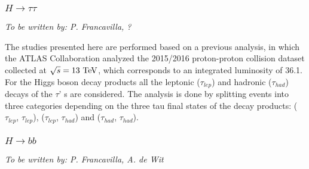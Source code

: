 


\subsubsection{$H \to \tau\tau$}
{\it To be written by: P. Francavilla, ?}

The studies presented here are performed based on a previous analysis, in which the ATLAS Collaboration analyzed the 2015/2016 proton-proton collision dataset collected at $\sqrt{s} = 13\,\TeV$, which corresponds to an integrated luminosity of 36.1\fbinv \cite{}. 
For the Higgs boson decay products all the leptonic ($\tau_{lep}$) and hadronic ($\tau_{had}$) decays of the $\tau$' s are considered. The analysis is done by splitting events into three categories depending on the three tau final states of the decay products: ($\tau_{lep}$, $\tau_{lep}$), ($\tau_{lep}$, $\tau_{had}$) and ($\tau_{had}$, $\tau_{had}$).



\subsubsection{$H \to bb$}
{\it To be written by: P. Francavilla, A. de Wit}

\newcommand{\TeV}{\ensuremath{\,\text{Te\hspace{-.08em}V}}\xspace}
\providecommand{\fbinv}{\mbox{\ensuremath{\,\text{fb}^\text{$-$1}}}\xspace}
\newcommand{\vh}{\ensuremath{\mathrm{V}\PH}\xspace}
\newcommand{\ttbar}{\ensuremath{\Pqt\Paqt}\xspace}
\newcommand{\zh}{\ensuremath{\PZ\PH}\xspace}
\newcommand{\ggZH}{\ensuremath{\Pg\Pg\PZ\PH}\xspace}
\providecommand{\wip}[1]{\textcolor{red}{\bfseries TODO: #1}\xspace}


